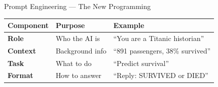 \documentclass[aspectratio=169,12pt]{beamer}
\begin{document}
\begin{frame}{Prompt Engineering --- The New Programming}
\begin{center}
\renewcommand{\arraystretch}{1.5}
\begin{tabular}{l l l}
\toprule
\textbf{Component} & \textbf{Purpose} & \textbf{Example} \\
\midrule
\textbf{Role} & Who the AI is & ``You are a Titanic historian'' \\
\textbf{Context} & Background info & ``891 passengers, 38\% survived'' \\
\textbf{Task} & What to do & ``Predict survival'' \\
\textbf{Format} & How to answer & ``Reply: SURVIVED or DIED'' \\
\bottomrule
\end{tabular}
\end{center}
\vspace{0.5cm}
\begin{center}
\end{center}
\end{frame}
\end{document}
